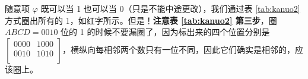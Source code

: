 \documentclass[UTF8]{ctexart}
\begin{document}
\newpage
{}
\BgThispage
随意项 $\varphi$ 既可以当 1 也可以当 0（只是不能中途更改），我们通过表 \ref{tab:kanuo2} 方式圈出所有的 1，如红字所示。但是！\textbf{注意表 \ref{tab:kanuo2} 第三步}，圈 $ABCD=0010$ 位的 1 的时候不要漏圈了，因为标出来的四个位置分别是 $\begin{bmatrix}
         0000 & 1000 \\
         0010 & 1010 \\
       \end{bmatrix}$，横纵向每相邻两个数只有一位不同，因此它们确实是相邻的，应该圈上。
       
\end{document}
